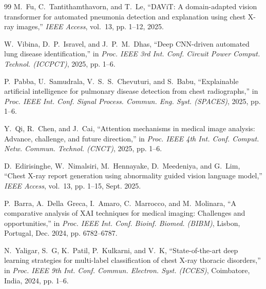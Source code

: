 \documentclass[journal]{IEEEtran}
\begin{document}
\begin{thebibliography}{99}
M.~Fu, C.~Tantithamthavorn, and T.~Le, ``DAViT: A domain-adapted vision transformer for automated pneumonia detection and explanation using chest X-ray images,'' \emph{IEEE Access}, vol.~13, pp. 1--12, 2025.

W.~Vibina, D.~P.~Isravel, and J.~P.~M.~Dhas, ``Deep CNN-driven automated lung disease identification,'' in \emph{Proc. IEEE 3rd Int. Conf. Circuit Power Comput. Technol. (ICCPCT)}, 2025, pp. 1--6.

P.~Pabba, U.~Samudrala, V.~S.~S.~Chevuturi, and S.~Babu, ``Explainable artificial intelligence for pulmonary disease detection from chest radiographs,'' in \emph{Proc. IEEE Int. Conf. Signal Process. Commun. Eng. Syst. (SPACES)}, 2025, pp. 1--6.

Y.~Qi, R.~Chen, and J.~Cai, ``Attention mechanisms in medical image analysis: Advance, challenge, and future direction,'' in \emph{Proc. IEEE 4th Int. Conf. Comput. Netw. Commun. Technol. (CNCT)}, 2025, pp. 1--6.

D.~Edirisinghe, W.~Nimalsiri, M.~Hennayake, D.~Meedeniya, and G.~Lim, ``Chest X-ray report generation using abnormality guided vision language model,'' \emph{IEEE Access}, vol.~13, pp. 1--15, Sept. 2025.

P.~Barra, A.~Della~Greca, I.~Amaro, C.~Marrocco, and M.~Molinara, ``A comparative analysis of XAI techniques for medical imaging: Challenges and opportunities,'' in \emph{Proc. IEEE Int. Conf. Bioinf. Biomed. (BIBM)}, Lisbon, Portugal, Dec. 2024, pp. 6782--6787.

N.~Yaligar, S.~G, K.~Patil, P.~Kulkarni, and V.~K, ``State-of-the-art deep learning strategies for multi-label classification of chest X-ray thoracic disorders,'' in \emph{Proc. IEEE 9th Int. Conf. Commun. Electron. Syst. (ICCES)}, Coimbatore, India, 2024, pp. 1--6.

\end{thebibliography}
\end{document}
